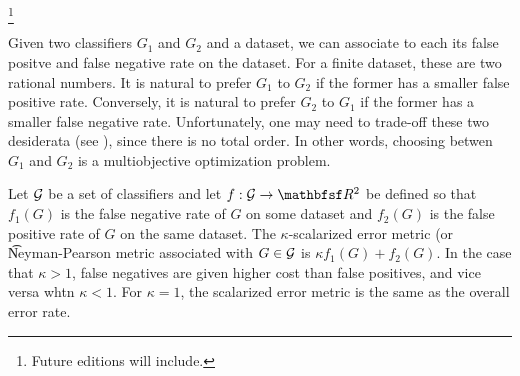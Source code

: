 
\footnote{Future editions will include.}


Given two classifiers $G_1$ and $G_2$ and a dataset, we can associate to each its false positve and false negative rate on the dataset.
For a finite dataset, these are two rational numbers.
It is natural to prefer $G_1$ to $G_2$ if the former has a smaller false positive rate.
Conversely, it is natural to prefer $G_2$ to $G_1$ if the former has a smaller false negative rate.
Unfortunately, one may need to trade-off these two desiderata (see ), since there is no total order.
In other words, choosing betwen $G_1$ and $G_2$ is a multiobjective optimization problem.


Let $\mathcal{G}$ be a set of classifiers and let $f: \CG \to \R^2$ be defined so that $f_1(G)$ is the false negative rate of $G$ on some dataset and $f_2(G)$ is the false positive rate of $G$ on the same dataset.
The \t{$\kappa$-scalarized error metric} (or \t{Neyman-Pearson metric} associated with $G \in \mathcal{G}$ is $\kappa f_1(G) + f_2(G)$.
In the case that $\kappa > 1$, false negatives are given higher cost than false positives, and vice versa whtn $\kappa < 1$.
For $\kappa = 1$, the scalarized error metric is the same as the overall error rate.

\blankpage
